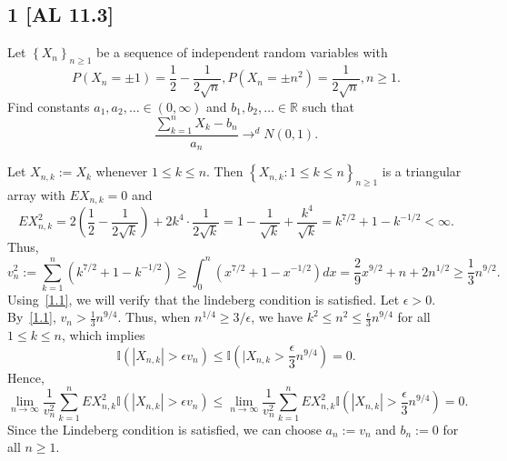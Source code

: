 \documentclass[12pt]{article}
\title{}
\author{Evan P. Walsh}
\begin{document}
\maketitle

\subsection*{1 [AL 11.3]}
\begin{tcolorbox}
  Let $\left\{ X_n \right\}_{n\geq 1}$ be a sequence of independent random variables with 
  \[ 
    P(X_n = \pm 1) = \frac{1}{2} - \frac{1}{2\sqrt{n}}, P(X_n = \pm n^{2}) = \frac{1}{2\sqrt{n}}, n \geq 1. 
  \]
  Find constants $a_1, a_2, \hdots \in (0,\infty)$ and $b_1, b_2, \hdots \in \mathbb{R}$ such that 
  \[
    \frac{\sum_{k=1}^{n}X_k - b_n}{a_n} \rightarrow^{d} N(0,1).
  \]
\end{tcolorbox}
Let $X_{n,k} := X_k$ whenever $1 \leq k \leq n$. Then $\left\{ X_{n,k} : 1\leq k \leq n \right\}_{n\geq 1}$ is a triangular array with $EX_{n,k} = 0$
and 
\[
  EX_{n,k}^{2} = 2\left( \frac{1}{2} - \frac{1}{2\sqrt{k}} \right) + 2k^{4}\cdot \frac{1}{2\sqrt{k}} = 1 - \frac{1}{\sqrt{k}} + \frac{k^{4}}{\sqrt{k}} = k^{7/2} + 1 - k^{-1/2} < \infty.
\]
Thus,
\begin{equation}
  v_{n}^{2} := \sum_{k=1}^{n}(k^{7/2} + 1 - k^{-1/2}) \geq \int_{0}^{n}(x^{7/2} + 1 - x^{-1/2})dx = \frac{2}{9}x^{9/2} + n + 2n^{1/2} \geq
  \frac{1}{3}n^{9/2}.
  \label{1.1}
\end{equation}
Using~\eqref{1.1}, we will verify that the lindeberg condition is satisfied. Let $\epsilon > 0$. By~\eqref{1.1}, $v_n > \frac{1}{3}n^{9/4}$.
Thus, when $n^{1/4} \geq 3 / \epsilon$, we have $k^{2} \leq
n^{2} \leq \frac{\epsilon}{3}n^{9/4}$ for all $1 \leq k \leq n$, which implies 
\[
  \mathbb{I}\left(|X_{n,k}| > \epsilon v_{n}\right) \leq \mathbb{I}\left(|X_{n,k} > \frac{\epsilon}{3}n^{9/4} \right) = 0.
\]
Hence,
\[ 
  \lim_{n\rightarrow\infty}\frac{1}{v_{n}^{2}}\sum_{k=1}^{n}EX_{n,k}^{2}\mathbb{I}\left( |X_{n,k}| > \epsilon v_{n} \right) \leq
  \lim_{n\rightarrow\infty}\frac{1}{v_{n}^{2}}\sum_{k=1}^{n}EX_{n,k}^{2}\mathbb{I}\left( |X_{n,k}| > \frac{\epsilon}{3}n^{9/4} \right) = 0.
\]
Since the Lindeberg condition is satisfied, we can choose $a_n := v_n$ and $b_n := 0$ for all $n \geq 1$.
\end{document}
